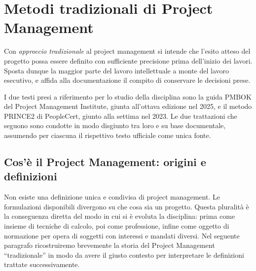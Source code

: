 %

\chapter{Metodi tradizionali di Project Management}
\label{cap:tradizionali}
\lhead[\fancyplain{}{\bfseries\thepage}]{\fancyplain{}{\bfseries\rightmark}}

Con \emph{approccio tradizionale} al project management si intende che l'esito
atteso del progetto possa essere definito con sufficiente precisione prima
dell'inizio dei lavori. Sposta dunque la maggior parte del lavoro intellettuale
a monte del lavoro esecutivo, e affida alla documentazione il compito di
conservare le decisioni prese.

I due testi presi a riferimento per lo studio della disciplina sono la guida
PMBOK del Project Management Institute, giunta all'ottava edizione nel 2025, e
il metodo PRINCE2 di PeopleCert, giunto alla settima nel 2023. Le due
trattazioni che seguono sono condotte in modo disgiunto tra loro e su base
documentale, assumendo per ciascuna il rispettivo testo ufficiale come unica
fonte.


\section{Cos'\`e il Project Management: origini e definizioni}

Non esiste una definizione unica e condivisa di project management. Le
formulazioni disponibili divergono su che cosa sia un progetto. Questa
pluralit\`a \`e la conseguenza diretta del modo in cui si \`e evoluta la
disciplina: prima come insieme di tecniche di calcolo, poi come professione,
infine come oggetto di normazione per opera di soggetti con interessi e mandati
diversi. Nel seguente paragrafo ricostruiremo brevemente la storia del Project
Management ``tradizionale'' in modo da avere il giusto contesto per interpretare
le definizioni trattate successivamente.


